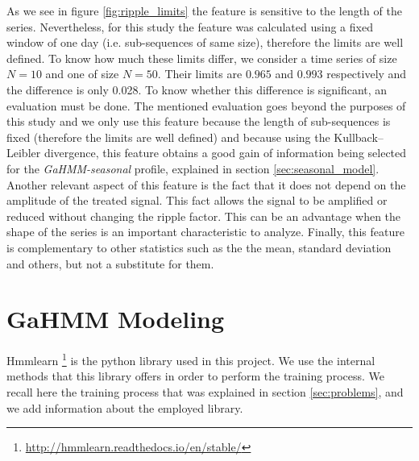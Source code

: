 As we see in figure \ref{fig:ripple_limits} the feature is sensitive to the length of the series. Nevertheless, for this study the feature was calculated using a fixed window of one day (i.e. sub-sequences of same size), therefore the limits are well defined. To know how much these limits differ, we consider a time series of size $N=10$ and one of size $N=50$. Their limits are $0.965$ and $0.993$ respectively and the difference is only 0.028. To know whether this difference is significant, an evaluation must be done. The mentioned evaluation goes beyond the purposes of this study and we only use this feature because the length of sub-sequences is fixed (therefore the limits are well defined) and because using the Kullback–Leibler divergence, this feature obtains a good gain of information being selected for the \textit{GaHMM-seasonal} profile, explained in section \ref{sec:seasonal_model}. \\

Another relevant aspect of this feature is the fact that it does not depend on the amplitude of the treated signal. This fact allows the signal to be amplified or reduced without changing the ripple factor. This can be an advantage when the shape of the series is an important characteristic to analyze. Finally, this feature is complementary to other statistics such as the the mean, standard deviation and others, but not a substitute for them.




\section{GaHMM Modeling}
\label{modeling}

Hmmlearn \cite{gahmm_manual} \footnote{\url{http://hmmlearn.readthedocs.io/en/stable/}} is the python library used in this project. We use the internal methods that this library offers in order to perform the training process. We recall here the training process that was explained in section \ref{sec:problems}, and we add information about the employed library. 



